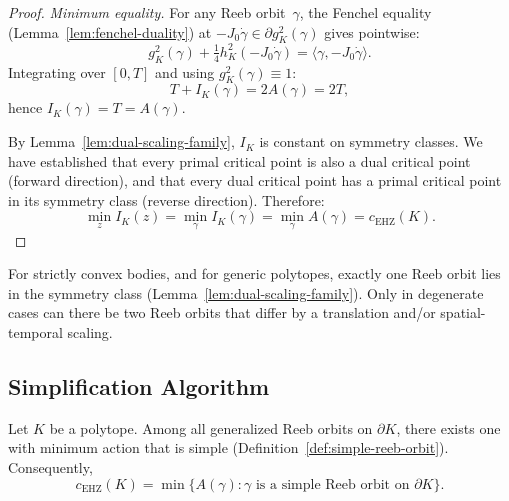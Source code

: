\begin{proof}
\medskip
\emph{Minimum equality.}
For any Reeb orbit~$\gamma$, the Fenchel equality (Lemma~\ref{lem:fenchel-duality})
at $-J_0\dot{\gamma} \in \partial g_K^2(\gamma)$ gives pointwise:
\[
  g_K^2(\gamma) + \tfrac{1}{4}h_K^2(-J_0\dot{\gamma})
  = \langle \gamma, -J_0\dot{\gamma} \rangle.
\]
Integrating over $[0,T]$ and using $g_K^2(\gamma) \equiv 1$:
\[
  T + I_K(\gamma) = 2A(\gamma) = 2T,
\]
hence $I_K(\gamma) = T = A(\gamma)$.

By Lemma~\ref{lem:dual-scaling-family}, $I_K$ is constant on symmetry classes.
We have established that every primal critical point is also a dual critical point (forward direction),
and that every dual critical point has a primal critical point in its symmetry class (reverse direction).
Therefore:
\[
  \min_z I_K(z) = \min_\gamma I_K(\gamma) = \min_\gamma A(\gamma) = c_{\mathrm{EHZ}}(K).
\]
\end{proof}

\begin{remark}\label{rem:symmetry-class-uniqueness}
For strictly convex bodies, and for generic polytopes, exactly one Reeb orbit
lies in the symmetry class (Lemma~\ref{lem:dual-scaling-family}).
Only in degenerate cases can there be two Reeb orbits that differ by a
translation and/or spatial-temporal scaling.
\end{remark}



\subsection{Simplification Algorithm}\label{subsec:simplification}

\begin{theorem*}
Let $K$ be a polytope.
Among all generalized Reeb orbits on $\partial K$, there exists one
with minimum action that is simple
(Definition~\ref{def:simple-reeb-orbit}).
Consequently,
\[
  c_{\mathrm{EHZ}}(K) = \min\bigl\{ A(\gamma) :
  \gamma \text{ is a simple Reeb orbit on } \partial K \bigr\}.
\]
\end{theorem*}


